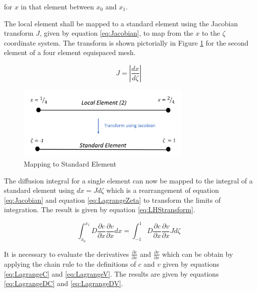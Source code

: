 \documentclass[11pt]{article}
\begin{document}
\hspace{10mm} for $x$ in that element between $x_0$ and $x_1$. \vspace{2mm}

The local element shall be mapped to a standard element using the Jacobian transform $J$, given by equation \ref{eq:Jacobian}, to map from the $x$ to the $\zeta$ coordinate system. The transform is shown pictorially in Figure \ref{fig:local2standard} for the second element of a four element equispaced mesh.


\begin{equation} \label{eq:Jacobian}
J = \left \vert \frac{dx}{d\zeta}\right \vert
\end{equation}



\begin{figure}[h!]
\centering
\includegraphics[width=0.75\textwidth]{Local2Standard.PNG}
\caption{Mapping to Standard Element}\label{fig:local2standard}
\end{figure}

The diffusion integral for a single element can now be mapped to the integral of a standard element using $dx = Jd\zeta$ which is a rearrangement of equation \ref{eq:Jacobian} and equation \ref{eq:LagrangeZeta} to transform the limits of integration. The result is given by equation \ref{eq:LHStransform}.

\begin{equation}
\label{eq:LHStransform}
\int_{x_0}^{x_{1}} D \frac{\partial c}{\partial x}  \frac{\partial v}{\partial x}  dx =  \int_{-1}^{1} D \frac{\partial c}{\partial x}  \frac{\partial v}{\partial x} J d\zeta
\end{equation}

It is necessary to evaluate the derivatives $\frac{\partial c}{\partial x}$ and $ \frac{\partial v}{\partial x}$ which can be obtain by applying the chain rule to the definitions of $c$ and $v$ given by equations \ref{eq:LagrangeC} and \ref{eq:LagrangeV}. The results are given by equations \ref{eq:LagrangeDC} and \ref{eq:LagrangeDV}.
\end{document}
